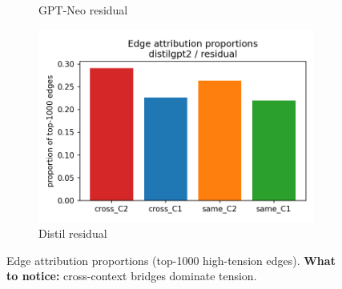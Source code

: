 \documentclass[11pt]{article}
\newcommand{\1}{\mathbf{1}}
\begin{document}
\begin{figure}[t]
\begin{subfigure}[t]{0.32\textwidth}
\caption{GPT-Neo residual}
\end{subfigure}\hfill
\begin{subfigure}[t]{0.32\textwidth}
\includegraphics[width=\linewidth]{figs/edge_attr_props_distilgpt2_residual.png}
\caption{Distil residual}
\end{subfigure}
\caption{Edge attribution proportions (top-1000 high-tension edges). \textbf{What to notice:} cross-context bridges dominate tension.}
\label{fig:edgeattr}
\end{figure}
\end{document}
